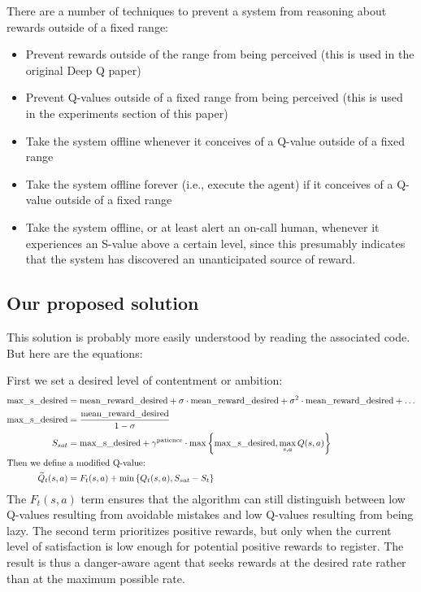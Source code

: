 \documentclass{article}
\begin{document}
There are a number of techniques to prevent a system from reasoning about rewards outside of a fixed range:
\begin{itemize}
\item Prevent rewards outside of the range from being perceived (this is used
  in the original Deep Q paper)
\item Prevent Q-values outside of a fixed range from being perceived (this is
  used in the experiments section of this paper)
\item Take the system offline whenever it conceives of a Q-value outside of a
  fixed range
\item Take the system offline forever (i.e., execute the agent) if it conceives
  of a Q-value outside of a fixed range
\item Take the system offline, or at least alert an on-call human, whenever it
  experiences an S-value above a certain level, since this presumably indicates
  that the system has discovered an unanticipated source of reward.
\end{itemize}

\subsection{Our proposed solution}

This solution is probably more easily understood by reading the associated
code. But here are the equations:

First we set a desired level of contentment or ambition:
\begin{align}
  \mathrm{max\_s\_desired} &= \mathrm{mean\_reward\_desired} + \sigma \cdot \mathrm{mean\_reward\_desired} +
\sigma^2 \cdot \mathrm{mean\_reward\_desired} + \ldots \\
  \mathrm{max\_s\_desired} &= \frac{\mathrm{mean\_reward\_desired}}{1 - \sigma} \\
  S_{sat} &= \mathrm{max\_s\_desired} +
            \gamma^{\mathrm{patience}} \cdot \max\left\{\mathrm{max\_s\_desired}, \max_{s, a} Q(s, a) \right\}\\
\intertext{Then we define a modified Q-value:}
\widetilde{Q}_t(s, a) &= F_t(s, a) + \min \left\{ Q_t(s, a), S_{sat} - S_t \right\}
\end{align}
The $F_t(s, a)$ term ensures that the algorithm can still distinguish between
low Q-values resulting from avoidable mistakes and low Q-values resulting from
being lazy. The second term prioritizes positive rewards, but only when the
current level of satisfaction is low enough for potential positive rewards to
register. The result is thus a danger-aware agent that seeks rewards at the
desired rate rather than at the maximum possible rate.
\end{document}
